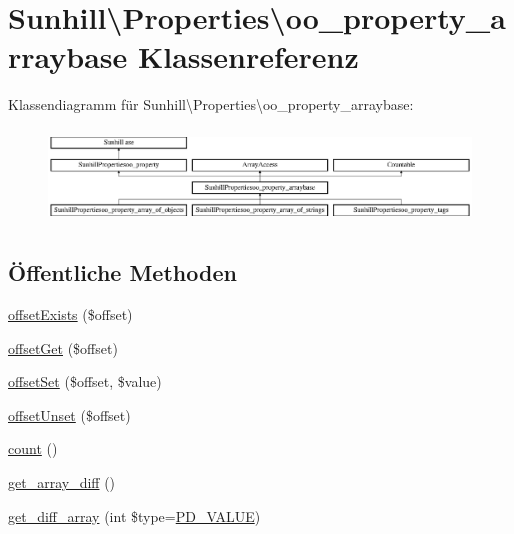 \hypertarget{classSunhill_1_1Properties_1_1oo__property__arraybase}{}\section{Sunhill\textbackslash{}Properties\textbackslash{}oo\+\_\+property\+\_\+arraybase Klassenreferenz}
\label{classSunhill_1_1Properties_1_1oo__property__arraybase}
Klassendiagramm für Sunhill\textbackslash{}Properties\textbackslash{}oo\+\_\+property\+\_\+arraybase\+:\begin{figure}[H]
\begin{center}
\leavevmode
\includegraphics[height=2.522522cm]{df/db2/classSunhill_1_1Properties_1_1oo__property__arraybase}
\end{center}
\end{figure}
\subsection*{Öffentliche Methoden}
\begin{DoxyCompactItemize}
\item 
\hyperlink{classSunhill_1_1Properties_1_1oo__property__arraybase_acd740bbd19b27245e2df55b4b383577d}{offset\+Exists} (\$offset)
\item 
\hyperlink{classSunhill_1_1Properties_1_1oo__property__arraybase_a6de01018a78f8874b5a413b3e9e9b52f}{offset\+Get} (\$offset)
\item 
\hyperlink{classSunhill_1_1Properties_1_1oo__property__arraybase_a1cbb3e04992a99e8df22e7c7f26071e3}{offset\+Set} (\$offset, \$value)
\item 
\hyperlink{classSunhill_1_1Properties_1_1oo__property__arraybase_a627b84bb6d26a665f523e8b1445dc3b5}{offset\+Unset} (\$offset)
\item 
\hyperlink{classSunhill_1_1Properties_1_1oo__property__arraybase_a73ea6101a7a2cbc51e7fa50a579c334f}{count} ()
\item 
\hyperlink{classSunhill_1_1Properties_1_1oo__property__arraybase_a5cc6b222f83c2258d79917920c5d73a0}{get\+\_\+array\+\_\+diff} ()
\item 
\hyperlink{classSunhill_1_1Properties_1_1oo__property__arraybase_a80472e7241be31b5ef0ed446528a26f3}{get\+\_\+diff\+\_\+array} (int \$type=\hyperlink{namespaceSunhill_1_1Properties_a28c3de9e20fd246123a2853f7055117d}{P\+D\+\_\+\+V\+A\+L\+UE})
\end{DoxyCompactItemize}
